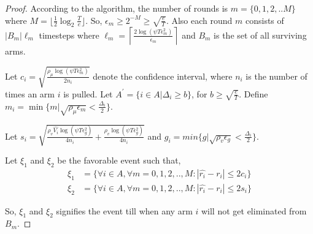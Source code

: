 \begin{proof}
According to the algorithm, the number of rounds is $m=\lbrace 0,1,2,.. M\rbrace $ where $M=\bigg\lfloor \frac{1}{2}\log_{2} \frac{T}{e}\bigg\rfloor$. So, $\epsilon_{m}\geq 2^{-M}\geq \sqrt{\frac{e}{T}}$. Also each round $m$ consists of $|B_{m}|\ell_{m}$ timesteps where $\ell_{m} = \left\lceil\frac{2\log(\psi T \epsilon_{m}^{2})}{\epsilon_{m}}\right\rceil$ and $B_{m}$ is the set of all surviving arms. 

Let $c_{i} = \sqrt{\frac{\rho_{\mu}\log{(\psi T\epsilon_{m}^{2})}}{2 n_{i}}}$ denote the confidence interval, where $n_{i}$ is the number of times an arm $i$ is pulled. Let $A^{'}=\lbrace i\in A|\Delta_{i}\geq b\rbrace$, for $b\geq \sqrt{\frac{e}{T}}$. Define $m_{i}=\min\lbrace m| \sqrt{\rho_{\mu}\epsilon_{m}}<\frac{\Delta_{i}}{2}\rbrace$.

Let $s_{i}=\sqrt{\frac{\rho_v \hat{V_{i}} \log{(\psi T\epsilon_{g}^{2})}}{4 n_{i}} + \frac{\rho_v \log{(\psi T\epsilon_{g}^{2})}}{4 n_{i}}}$ and 
$g_{i}=min\lbrace g| \sqrt{\rho_{v}\epsilon_{g}}<\frac{\Delta_{i}}{2}\rbrace$. 


Let $\xi_{1}$ and $\xi_{2}$ be the favorable event such that,
\begin{align*}
\xi_{1}&=\bigg\lbrace \forall i\in A, \forall m=0,1,2,..,M: |\hat{r_i} - r_i| \leq 2c_i\bigg\rbrace\\
\xi_{2}&=\bigg\lbrace \forall i\in A, \forall m=0,1,2,..,M: |\hat{r_i} - r_i| \leq  2s_i\bigg\rbrace
\end{align*}

So, $\xi_{1}$ and $\xi_{2}$ signifies the event till when any arm $i$ will not get eliminated from $B_m$.




\end{proof}

